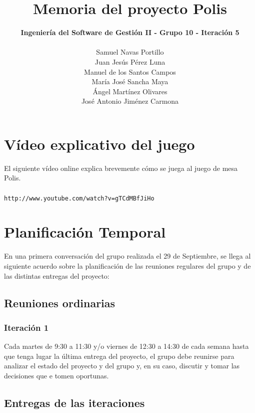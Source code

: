 \documentclass[11 pt]{book}
\begin{document}
\title{\textbf {\Huge Memoria del proyecto Polis}}
\author{
	\textbf {Ingeniería del Software de Gestión II - Grupo 10 - Iteración 5}\\\\
	Samuel Navas Portillo\\
	Juan Jesús Pérez Luna\\
	Manuel de los Santos Campos\\
	María José Sancha Maya\\
	Ángel Martínez Olivares\\
	José Antonio Jiménez Carmona}
\maketitle
\tableofcontents{}

\chapter{Vídeo explicativo del juego}
	El siguiente vídeo online explica brevemente cómo se juega al juego de mesa Polis.\\ \\
	\texttt{http://www.youtube.com/watch?v=gTCdMBfJiHo}
	
\chapter{Planificación Temporal}
	En una primera conversación del grupo realizada el 29 de Septiembre, se llega al siguiente acuerdo sobre la planificación de las reuniones regulares del grupo y de las distintas entregas del proyecto:\\

    \section{Reuniones ordinarias}
        \subsection*{Iteración 1}
	        Cada martes de 9:30 a 11:30 y/o viernes de 12:30 a 14:30 de cada semana hasta que tenga lugar la última entrega del proyecto, el grupo debe reunirse para analizar el estado del proyecto y del grupo y, en su caso, discutir y tomar las decisiones que e tomen oportunas.\\

    \section{Entregas de las iteraciones}
\end{document}
